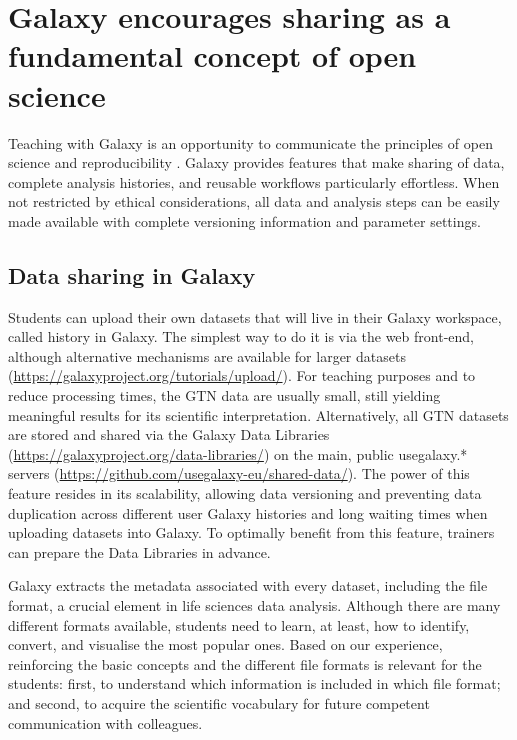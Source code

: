 \section*{Galaxy encourages sharing as a fundamental concept of open science}


Teaching with Galaxy is an opportunity to communicate the principles of open science and reproducibility \cite{Baker_2020,Jim_nez_2017}. Galaxy provides features that make sharing of data, complete analysis histories, and reusable workflows particularly effortless. When not restricted by ethical considerations, all data and analysis steps can be easily made available with complete versioning information and parameter settings.

\subsection*{Data sharing in Galaxy}

Students can upload their own datasets that will live in their Galaxy workspace, called history in Galaxy. The simplest way to do it is via the web front-end, although alternative mechanisms are available for larger datasets (\url{https://galaxyproject.org/tutorials/upload/}). For teaching purposes and to reduce processing times, the GTN data are usually small, still yielding meaningful results for its scientific interpretation. Alternatively, all GTN datasets are stored and shared via the Galaxy Data Libraries (\url{https://galaxyproject.org/data-libraries/}) on the main, public usegalaxy.* servers (\url{https://github.com/usegalaxy-eu/shared-data/}). The power of this feature resides in its scalability, allowing data versioning and preventing data duplication across different user Galaxy histories and long waiting times when uploading datasets into Galaxy. To optimally benefit from this feature, trainers can prepare the Data Libraries in advance.

Galaxy extracts the metadata associated with every dataset, including the file format, a crucial element in life sciences data analysis. Although there are many different formats available, students need to learn, at least, how to identify, convert, and visualise the most popular ones. Based on our experience, reinforcing the basic concepts and the different file formats is relevant for the students: first, to understand which information is included in which file format; and second, to acquire the scientific vocabulary for future competent communication with colleagues.


